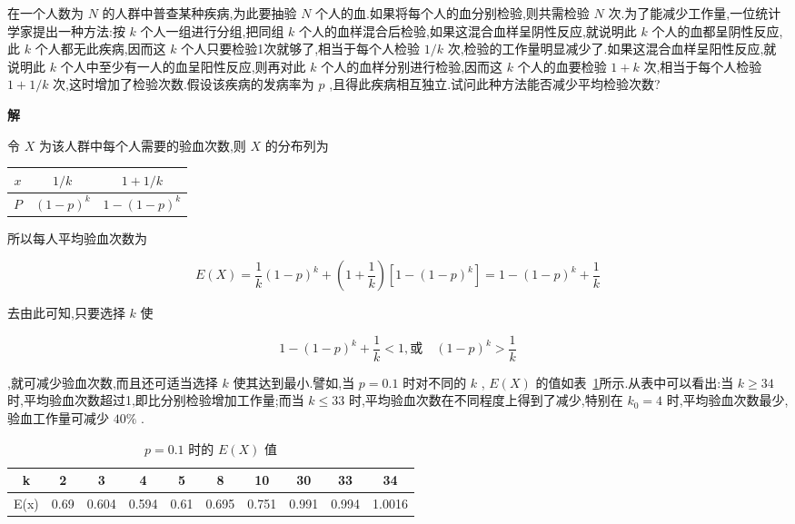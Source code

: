 \begin{example}\label{exam:2.2.2}
	在一个人数为 $ N $ 的人群中普查某种疾病,为此要抽验 $ N $ 个人的血.如果将每个人的血分别检验,则共需检验 $ N $ 次.为了能减少工作量,一位统计学家提出一种方法:按 $ k $ 个人一组进行分组,把同组 $ k $ 个人的血样混合后检验,如果这混合血样呈阴性反应,就说明此 $ k $ 个人的血都呈阴性反应,此 $ k $ 个人都无此疾病,因而这 $ k $ 个人只要检验1次就够了,相当于每个人检验 $ 1/k $ 次,检验的工作量明显减少了.如果这混合血样呈阳性反应,就说明此 $ k $ 个人中至少有一人的血呈阳性反应,则再对此 $ k $ 个人的血样分别进行检验,因而这 $ k $ 个人的血要检验 $ 1+k $ 次,相当于每个人检验 $ 1+1/k $ 次,这时增加了检验次数.假设该疾病的发病率为 $ p $ ,且得此疾病相互独立.试问此种方法能否减少平均检验次数?
	
	\textbf{解}
	
	令 $ X $ 为该人群中每个人需要的验血次数,则 $ X $ 的分布列为
	
	\begin{table}[htbp]
		\centering
		\begin{tabular}{c|cc}
			 $ x $ 	& $ 1 / k $ & $ 1+1 / k $ \\\midrule
			 $ P $ 	& $ (1-p)^{k} $ & $ 1-(1-p)^{k} $ \\
		\end{tabular}%
	\end{table}%
	
\end{example}

所以每人平均验血次数为

\[ 
E(X)=\frac{1}{k}(1-p)^{k}+\left(1+\frac{1}{k}\right)\left[1-(1-p)^{k}\right]=1-(1-p)^{k}+\frac{1}{k}
\]

去由此可知,只要选择 $ k $ 使

\[ 
1-(1-p)^{k}+\frac{1}{k}<1, \text{或} \quad(1-p)^{k}>\frac{1}{k}
\]

,就可减少验血次数,而且还可适当选择 $ k $ 使其达到最小.譬如,当 $ p=0.1 $ 时对不同的 $ k $ , $ E(X) $ 的值如表~\ref{tab:2.2.1}所示.从表中可以看出:当 $ k \geqslant 34 $ 时,平均验血次数超过1,即比分别检验增加工作量;而当 $ k \leqslant 33 $ 时,平均验血次数在不同程度上得到了减少,特别在 $ k_{0}=4 $ 时,平均验血次数最少,验血工作量可减少 $ 40\% $ .

\begin{table}[htbp]
	\centering
	\caption{ $ p=0.1 $ 时的 $ E(X) $ 值}
	\begin{tabular}{c|ccccccccc}
		\toprule
		k     & 2     & 3     & 4     & 5     & 8     & 10    & 30    & 33    & 34 \\\midrule
		E(x)  & 0.69  & 0.604 & 0.594 & 0.61  & 0.695 & 0.751 & 0.991 & 0.994 & 1.0016 \\\bottomrule
	\end{tabular}%
	\label{tab:2.2.1}%
\end{table}%


